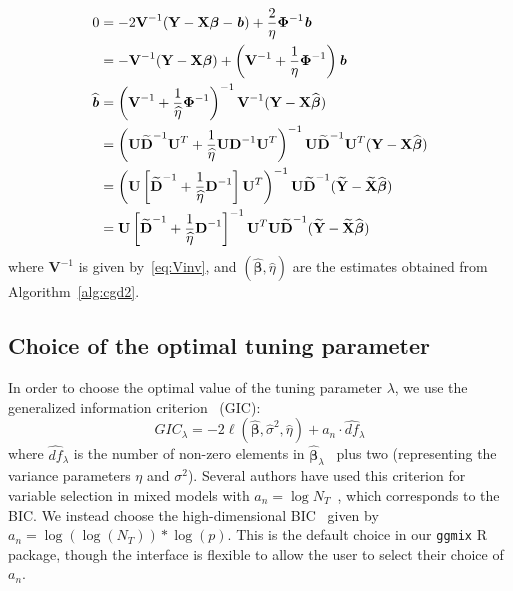 \documentclass[12pt,letter]{article}\usepackage[]{graphicx}\usepackage[]{color}
\newcommand{\bX}{\textbf{X}}
\newcommand{\bY}{\textbf{Y}}
\newcommand{\bD}{\textbf{D}}
\newcommand{\bXtilde}{\widetilde{\bX}}
\newcommand{\bYtilde}{\widetilde{\bY}}
\newcommand{\bDtilde}{\widetilde{\bD}}
\newcommand{\bU}{\textbf{U}}
\newcommand{\bV}{\textbf{V}}
\newcommand{\bb}{\textbf{\emph{b}}}
\newcommand{\bbeta}{\boldsymbol{\beta}}
\newcommand{\bPhi}{\boldsymbol{\Phi}}
\begin{document}
\begin{align}
	0 & = -2 \bV^{-1} (\bY - \bX \bbeta - \bb) + \frac{2}{\eta} \bPhi^{-1}\bb \nonumber \\
	& = -\bV^{-1}  (\bY - \bX \bbeta ) + \left(\bV^{-1} + \frac{1}{\eta}\bPhi^{-1}\right) \bb  \nonumber\\
	\widehat{\bb} & = \left(\bV^{-1} + \frac{1}{\widehat{\eta}}\bPhi^{-1}\right)^{-1}\bV^{-1}  (\bY - \bX \widehat{\bbeta} ) \nonumber \\
	& = \left(\bU \bDtilde^{-1} \bU^T + \frac{1}{\widehat{\eta}}\bU \bD^{-1} \bU^T\right)^{-1} \bU \bDtilde^{-1} \bU^T (\bY - \bX \widehat{\bbeta} ) \nonumber \\
	& = \left(\bU \left[\bDtilde^{-1} + \frac{1}{\widehat{\eta}} \bD^{-1} \right] \bU^T \right)^{-1} \bU \bDtilde^{-1} (\bYtilde - \bXtilde \widehat{\bbeta} ) \nonumber \\
	& = \bU \left[\bDtilde^{-1} + \frac{1}{\widehat{\eta}} \bD^{-1} \right]^{-1} \bU^T \bU \bDtilde^{-1} (\bYtilde - \bXtilde \widehat{\bbeta} ) \nonumber
\end{align}
where $\bV^{-1}$ is given by~\eqref{eq:Vinv}, and $(\widehat{\bbeta}, \widehat{\eta})$ are the estimates obtained from Algorithm~\ref{alg:cgd2}.

\subsection{Choice of the optimal tuning parameter}

In order to choose the optimal value of the tuning parameter $\lambda$, we use the generalized information criterion~\citep{nishii1984asymptotic} (GIC):
\begin{equation}
	GIC_{\lambda} = -2 \ell(\widehat{\bbeta}, \widehat{\sigma}^2, \widehat{\eta}) + a_n \cdot \widehat{df}_{\lambda}
\end{equation}
where $\widehat{df}_{\lambda}$ is the number of non-zero elements in $\widehat{\bbeta}_{\lambda}$~\citep{zou2007degrees} plus two (representing the variance parameters $\eta$ and $\sigma^2$). Several authors have used this criterion for variable selection in mixed models with $a_n = \log N_T$~\citep{bondell2010joint,schelldorfer2011estimation}, which corresponds to the BIC. We instead choose the high-dimensional BIC~\citep{fan2013tuning} given by $a_n = \log(\log(N_T)) * \log(p)$. This is the default choice in our \texttt{ggmix} R package, though the interface is flexible to allow the user to select their choice of $a_n$. 
\end{document}
